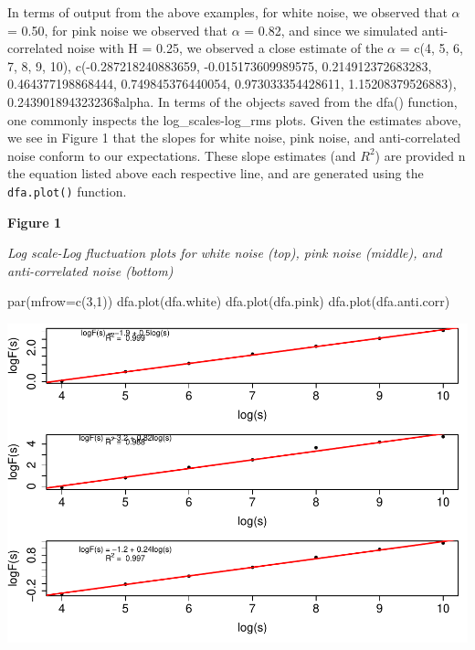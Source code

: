 \documentclass[
  man]{apa6}
\newenvironment{Shaded}{\begin{snugshade}}{\end{snugshade}}
\newcommand{\AttributeTok}[1]{\textcolor[rgb]{0.77,0.63,0.00}{#1}}
\newcommand{\DecValTok}[1]{\textcolor[rgb]{0.00,0.00,0.81}{#1}}
\newcommand{\FunctionTok}[1]{\textcolor[rgb]{0.00,0.00,0.00}{#1}}
\newcommand{\NormalTok}[1]{#1}
\begin{document}
In terms of output from the above examples, for white noise, we observed
that \(\alpha\) = 0.50, for pink noise we observed that
\(\alpha\) = 0.82, and since we simulated anti-correlated
noise with H = 0.25, we observed a close estimate of the \(\alpha\) =
c(4, 5, 6, 7, 8, 9, 10), c(-0.287218240883659, -0.015173609989575, 0.214912372683283, 0.464377198868444, 0.749845376440054, 0.973033354428611, 1.15208379526883), 0.243901894323236\$alpha. In terms of the objects saved from the dfa()
function, one commonly inspects the log\_scales-log\_rms plots. Given the
estimates above, we see in Figure 1 that the slopes for white noise,
pink noise, and anti-correlated noise conform to our expectations. These
slope estimates (and \(R^2\)) are provided n the equation listed above
each respective line, and are generated using the \texttt{dfa.plot()} function.

\textbf{Figure 1}

\emph{Log scale-Log fluctuation plots for white noise (top), pink noise
(middle), and anti-correlated noise (bottom)}

\begin{Shaded}
\begin{Highlighting}[]
\FunctionTok{par}\NormalTok{(}\AttributeTok{mfrow=}\FunctionTok{c}\NormalTok{(}\DecValTok{3}\NormalTok{,}\DecValTok{1}\NormalTok{))}
\FunctionTok{dfa.plot}\NormalTok{(dfa.white)}
\FunctionTok{dfa.plot}\NormalTok{(dfa.pink)}
\FunctionTok{dfa.plot}\NormalTok{(dfa.anti.corr)}
\end{Highlighting}
\end{Shaded}

\includegraphics{fractal_regression_paper_brm_files/figure-latex/unnamed-chunk-3-1.pdf}
\end{document}

